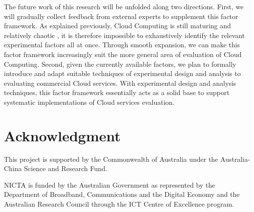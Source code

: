 \documentclass[10pt, conference, compsocconf]{IEEEtran}
\begin{document}
The future work of this research will be unfolded along two directions. First, we will gradually collect feedback from external experts to supplement this factor framework. As explained previously, Cloud Computing is still maturing and relatively chaotic \cite{Stokes_2011}, it is therefore impossible to exhaustively identify the relevant experimental factors all at once. Through smooth expansion, we can make this factor framework increasingly suit the more general area of evaluation of Cloud Computing. Second, given the currently available factors, we plan to formally introduce and adapt suitable techniques of experimental design and analysis to evaluating commercial Cloud services. With experimental design and analysis techniques, this factor framework essentially acts as a solid base to support systematic implementations of Cloud services evaluation. 

\section*{Acknowledgment}

This project is supported by the Commonwealth of Australia under the Australia-China Science and Research Fund.

NICTA is funded by the Australian Government as represented by the Department of Broadband, Communications and the Digital Economy and the Australian Research Council through the ICT Centre of Excellence program.
\end{document}
